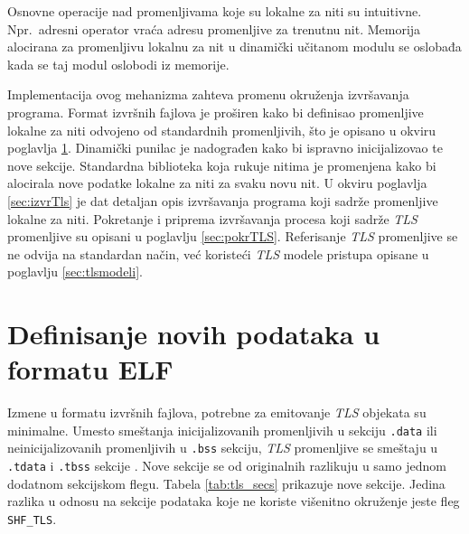 \documentclass[12pt,oneside]{memoir}
\begin{document}
Osnovne operacije nad promenljivama koje su lokalne za niti su intuitivne. Npr.~adresni operator vraća adresu promenljive za trenutnu nit. Memorija alocirana za promenljivu lokalnu za nit u dinamički učitanom modulu se oslobađa kada se taj modul oslobodi iz memorije.

Implementacija ovog mehanizma zahteva promenu okruženja izvršavanja programa. Format izvršnih fajlova je proširen kako bi definisao promenljive lokalne za niti odvojeno od standardnih promenljivih, što je opisano u okviru poglavlja \ref{sec:defElfTls}. Dinamički punilac je nadograđen kako bi ispravno inicijalizovao te nove sekcije. Standardna biblioteka koja rukuje nitima je promenjena kako bi alocirala nove podatke lokalne za niti za svaku novu nit. U okviru poglavlja \ref{sec:izvrTls} je dat detaljan opis izvršavanja programa koji sadrže promenljive lokalne za niti. Pokretanje i priprema izvršavanja procesa koji sadrže \emph{TLS} promenljive su opisani u poglavlju \ref{sec:pokrTLS}. Referisanje \emph{TLS} promenljive se ne odvija na standardan način, već koristeći \emph{TLS} modele pristupa opisane u poglavlju \ref{sec:tlsmodeli}.

\section{Definisanje novih podataka u formatu ELF}
\label{sec:defElfTls}

Izmene u formatu izvršnih fajlova, potrebne za emitovanje \emph{TLS} objekata su minimalne. Umesto smeštanja inicijalizovanih promenljivih u sekciju \texttt{.data} ili neinicijalizovanih promenljivih u \texttt{.bss} sekciju, \emph{TLS} promenljive se smeštaju u \texttt{.tdata} i \texttt{.tbss} sekcije \cite{TLS}. Nove sekcije se od originalnih razlikuju u samo jednom dodatnom sekcijskom flegu. Tabela \ref{tab:tls_secs} prikazuje nove sekcije. Jedina razlika u odnosu na sekcije podataka koje ne koriste višenitno okruženje jeste fleg \texttt{SHF\_TLS}.
\end{document}
